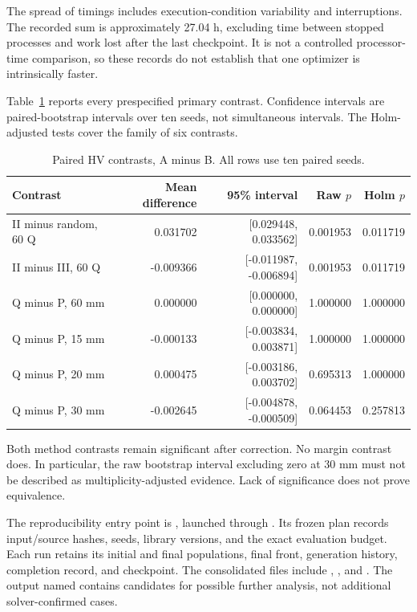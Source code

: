 The spread of timings includes execution-condition variability and interruptions. The recorded sum is approximately 27.04 h, excluding time between stopped processes and work lost after the last checkpoint. It is not a controlled processor-time comparison, so these records do not establish that one optimizer is intrinsically faster.

Table~\ref{tab:s_optimizer_pairs} reports every prespecified primary contrast. Confidence intervals are paired-bootstrap intervals over ten seeds, not simultaneous intervals. The Holm-adjusted tests cover the family of six contrasts.
\begin{table}[htbp]
\centering\small
\caption{Paired HV contrasts, A minus B. All rows use ten paired seeds.}\label{tab:s_optimizer_pairs}
\begin{tabular}{lrrrr}
\toprule
Contrast & Mean difference & 95\% interval & Raw $p$ & Holm $p$ \\
\midrule
II minus random, 60 Q & 0.031702 & [0.029448, 0.033562] & 0.001953 & 0.011719 \\
II minus III, 60 Q & -0.009366 & [-0.011987, -0.006894] & 0.001953 & 0.011719 \\
Q minus P, 60 mm & 0.000000 & [0.000000, 0.000000] & 1.000000 & 1.000000 \\
Q minus P, 15 mm & -0.000133 & [-0.003834, 0.003871] & 1.000000 & 1.000000 \\
Q minus P, 20 mm & 0.000475 & [-0.003186, 0.003702] & 0.695313 & 1.000000 \\
Q minus P, 30 mm & -0.002645 & [-0.004878, -0.000509] & 0.064453 & 0.257813 \\
\bottomrule
\end{tabular}
\end{table}
Both method contrasts remain significant after correction. No margin contrast does. In particular, the raw bootstrap interval excluding zero at 30 mm must not be described as multiplicity-adjusted evidence. Lack of significance does not prove equivalence.

The reproducibility entry point is , launched through . Its frozen plan records input/source hashes, seeds, library versions, and the exact evaluation budget. Each run retains its initial and final populations, final front, generation history, completion record, and checkpoint. The consolidated files include , , and . The output named  contains candidates for possible further analysis, not additional solver-confirmed cases.

